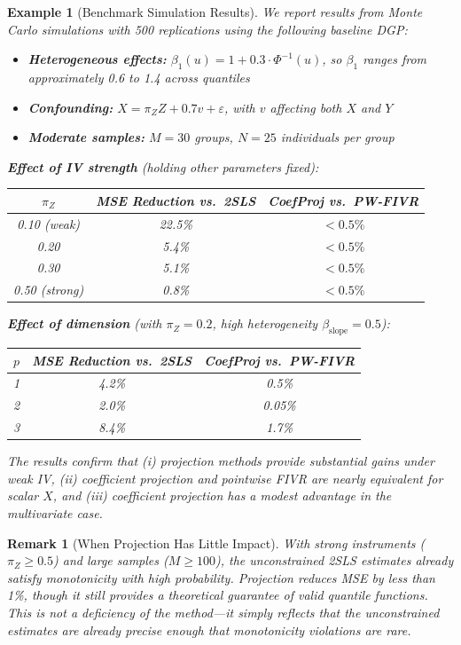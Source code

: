 \documentclass[12pt]{article}
\newtheorem{example}{Example}
\newtheorem{remark}{Remark}
\begin{document}
\begin{example}[Benchmark Simulation Results]
We report results from Monte Carlo simulations with 500 replications using the following baseline DGP:
\begin{itemize}
\item \textbf{Heterogeneous effects:} $\beta_1(u) = 1 + 0.3 \cdot \Phi^{-1}(u)$, so $\beta_1$ ranges from approximately 0.6 to 1.4 across quantiles
\item \textbf{Confounding:} $X = \pi_Z Z + 0.7 v + \varepsilon$, with $v$ affecting both $X$ and $Y$
\item \textbf{Moderate samples:} $M = 30$ groups, $N = 25$ individuals per group
\end{itemize}

\textbf{Effect of IV strength} (holding other parameters fixed):
\begin{center}
\begin{tabular}{ccc}
\hline
$\pi_Z$ & MSE Reduction vs.\ 2SLS & CoefProj vs.\ PW-FIVR \\
\hline
0.10 (weak) & 22.5\% & $<0.5\%$ \\
0.20 & 5.4\% & $<0.5\%$ \\
0.30 & 5.1\% & $<0.5\%$ \\
0.50 (strong) & 0.8\% & $<0.5\%$ \\
\hline
\end{tabular}
\end{center}

\textbf{Effect of dimension} (with $\pi_Z = 0.2$, high heterogeneity $\beta_{\text{slope}} = 0.5$):
\begin{center}
\begin{tabular}{ccc}
\hline
$p$ & MSE Reduction vs.\ 2SLS & CoefProj vs.\ PW-FIVR \\
\hline
1 & 4.2\% & 0.5\% \\
2 & 2.0\% & 0.05\% \\
3 & 8.4\% & 1.7\% \\
\hline
\end{tabular}
\end{center}

The results confirm that (i) projection methods provide substantial gains under weak IV, (ii) coefficient projection and pointwise FIVR are nearly equivalent for scalar $X$, and (iii) coefficient projection has a modest advantage in the multivariate case.
\end{example}

\begin{remark}[When Projection Has Little Impact]
With strong instruments ($\pi_Z \geq 0.5$) and large samples ($M \geq 100$), the unconstrained 2SLS estimates already satisfy monotonicity with high probability. Projection reduces MSE by less than 1\%, though it still provides a theoretical guarantee of valid quantile functions. This is not a deficiency of the method---it simply reflects that the unconstrained estimates are already precise enough that monotonicity violations are rare.
\end{remark}
\end{document}
